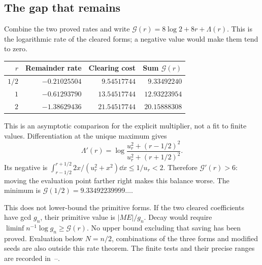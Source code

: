 \subsection{The gap that remains}
Combine the two proved rates and write
$\mathcal G(r)=8\log2+8r+\Lambda(r)$.
This is the logarithmic rate of the cleared forms; a negative value
would make them tend to zero.
\begin{center}
\begin{tabular}{@{}rrrr@{}}
\toprule
$r$ & Remainder rate & Clearing cost & Sum $\mathcal G(r)$\\
\midrule
$1/2$ & $-0.21025504$ & $9.54517744$ & $9.33492240$\\
$1$ & $-0.61293790$ & $13.54517744$ & $12.93223954$\\
$2$ & $-1.38629436$ & $21.54517744$ & $20.15888308$\\
\bottomrule
\end{tabular}
\end{center}
This is an asymptotic comparison for the explicit multiplier, not a fit
to finite values. Differentiation at the unique maximum gives
\[
 \Lambda'(r)=\log\frac{u_r^2+(r-1/2)^2}{u_r^2+(r+1/2)^2}.
\]
Its negative is $\int_{r-1/2}^{r+1/2}2x/(u_r^2+x^2)\dd x
\le1/u_r<2$. Therefore $\mathcal G'(r)>6$: moving the evaluation
point farther right makes this balance worse. The minimum is
$\mathcal G(1/2)=9.33492239999\ldots$.

This does not lower-bound the primitive forms. If the two cleared
coefficients have gcd $g_n$, their primitive value is $|M E|/g_n$.
Decay would require $\liminf n^{-1}\log g_n\ge\mathcal G(r)$.
No upper bound excluding that saving has been proved. Evaluation below
$N=n/2$, combinations of the three forms and modified seeds are also
outside this rate theorem. The finite tests and their precise ranges
are recorded in~--.
